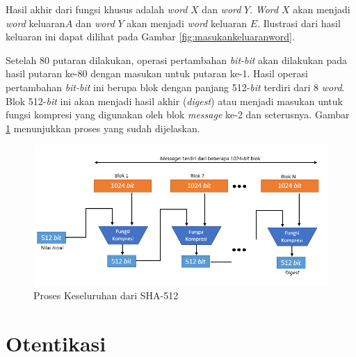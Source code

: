 Hasil akhir dari fungsi khusus adalah \textit{word} \begin{math}X\end{math} dan \textit{word} \begin{math}Y\end{math}. \textit{Word} \begin{math}X\end{math} akan menjadi \textit{word} keluaran\begin{math}A\end{math} dan \textit{word} \begin{math}Y\end{math} akan menjadi \textit{word} keluaran \begin{math}E\end{math}. Ilustrasi dari hasil keluaran ini dapat dilihat pada Gambar \ref{fig:masukankeluaranword}.

Setelah 80 putaran dilakukan, operasi pertambahan \textit{bit-bit} akan dilakukan pada hasil putaran ke-80 dengan masukan untuk putaran ke-1. Hasil operasi pertambahan \textit{bit-bit} ini berupa blok dengan panjang 512-\textit{bit} terdiri dari 8 \textit{word}. Blok 512-\textit{bit} ini akan menjadi hasil akhir (\textit{digest}) atau menjadi masukan untuk fungsi kompresi yang digunakan oleh blok \textit{message} ke-2 dan seterusnya. Gambar \ref{fig:digestcreate} menunjukkan proses yang sudah dijelaskan.

\begin{figure}[H]
	\includegraphics[scale=0.7]{Gambar/digest_creation}
	\caption{Proses Keseluruhan dari SHA-512}\label{fig:digestcreate}
\end{figure}

\section{Otentikasi}

